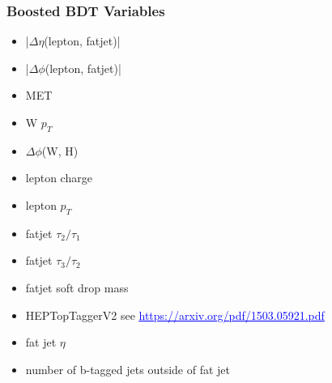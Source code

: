 \documentclass{beamer}
\newcommand{\backupend}{
  \addtocounter{framenumbervorappendix}{-\value{framenumber}}
  \addtocounter{framenumber}{\value{framenumbervorappendix}}
}
\newcommand{\link}[2]{\href{#2}{\textcolor{blue}{\underline{#1}}}}
\begin{document}
\begin{frame}
  \frametitle{Boosted BDT Variables}

  \begin{itemize}
  \item |$\Delta\eta$(lepton, fatjet)|
  \item |$\Delta\phi$(lepton, fatjet)|
  \item MET
  \item W $p_T$
  \item $\Delta\phi$(W, H)
  \item lepton charge
  \item lepton $p_T$
  \item fatjet $\tau_2/\tau_1$
  \item fatjet $\tau_3/\tau_2$
  \item fatjet soft drop mass
  \item HEPTopTaggerV2 see \link{https://arxiv.org/pdf/1503.05921.pdf}{https://arxiv.org/pdf/1503.05921.pdf}
  \item fat jet $\eta$
  \item number of b-tagged jets outside of fat jet
  \end{itemize}

\end{frame}

%

\backupend
\end{document}
